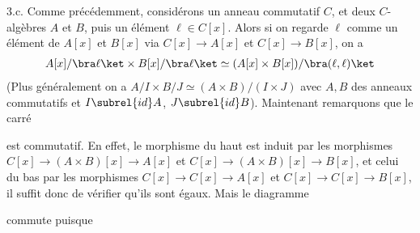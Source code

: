 \documentclass[11pt]{article}
\begin{document}
    \begin{question}{3.c.}
        \label{q3c}
        Comme précédemment, considérons un anneau commutatif $C$, et deux $C$-algèbres $A$ et $B$, puis un élément $\ell \in C[x]$. Alors si on regarde $\ell$ comme un élément de $A[x]$ et $B[x]$ via $C[x] \to A[x]$ et $C[x] \to B[x]$, on a
        \begin{align*}
            A[x]/\bra \ell \ket \times B[x]/\bra \ell \ket \simeq (A[x] \times B[x])/\bra (\ell, \ell) \ket
        \end{align*}
        (Plus généralement on a $A/I \times B/J \simeq (A \times B)/(I \times J)$ avec $A,B$ des anneaux commutatifs et $I \subrel{id} A$, $J \subrel{id} B$). Maintenant remarquons que le carré
        \begin{figure}[H]
            \centering
        \end{figure}
        est commutatif. En effet, le morphisme du haut est induit par les morphismes $C[x] \to (A \times B)[x] \to A[x]$ et $C[x] \to (A \times B)[x] \to B[x]$, et celui du bas par les morphismes $C[x] \to C[x] \to A[x]$ et $C[x] \to C[x] \to B[x]$, il suffit donc de vérifier qu'ils sont égaux. Mais le diagramme
        \begin{figure}[H]
            \centering
        \end{figure}
        commute puisque
        \begin{figure}[H]
            \centering

\end{figure}
\end{question}
\end{document}
